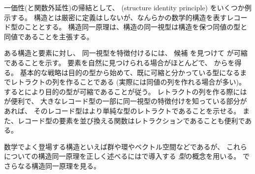 \documentclass[index]{subfiles}
\begin{document}

一価性(と関数外延性)の帰結として、
(structure identity principle)
をいくつか例示する。
構造とは厳密に定義はしないが、なんらかの数学的構造を表すレコード型のこととする。
構造同一原理は、構造の同一視型は構造を保つ同値の型と同値であることを主張する。

ある構造と要素に対し、
同一視型を特徴付けるには、
候補
を見つけて
が可縮であることを示す。
要素を自然に見つけられる場合がほとんどで、
からを得る。
基本的な戦略は目的の型から始めて、既に可縮と分かっている型になるまでレトラクトの列を作ることである
(実際には同値の列を作れる場合が多い)。
するとにより目的の型が可縮であることが従う。
レトラクトの列を作る際にはが便利で、
大きなレコード型の一部に同一視型の特徴付けを知っている部分があれば、
そのレコード型はより単純な型のレトラクトであることを示せる。
また、レコード型の要素を並び換える関数はレトラクションであることも便利である。





数学でよく登場する構造といえば群や環やベクトル空間などであるが、
これらについての構造同一原理を正しく述べるにはで導入する
\emph{型}の概念を用いる。
でさらなる構造同一原理を見る。
\end{document}
